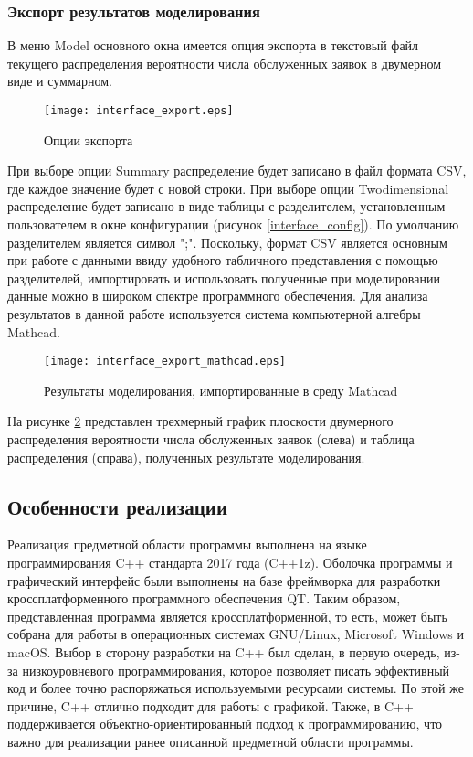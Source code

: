 \subsubsection{Экспорт результатов моделирования}
В меню Model основного окна имеется опция экспорта в текстовый файл текущего распределения вероятности числа обслуженных заявок в двумерном виде и суммарном.
\begin{figure}[H]
	\centering
	\texttt{[image: interface\_export.eps]}
	\caption{Опции экспорта}
	\label{interface_export}
\end{figure}
При выборе опции Summary распределение будет записано в файл формата CSV, где каждое значение будет с новой строки. При выборе опции Twodimensional распределение будет записано в виде таблицы с разделителем, установленным пользователем в окне конфигурации (рисунок \ref{interface_config}). По умолчанию разделителем является символ ";". Поскольку, формат CSV является основным при работе с данными ввиду удобного табличного представления с помощью разделителей, импортировать и использовать полученные при моделировании данные можно в широком спектре программного обеспечения. Для анализа результатов в данной работе используется система компьютерной алгебры Mathcad.
\begin{figure}[H]
	\centering
	\texttt{[image: interface\_export\_mathcad.eps]}
	\caption{Результаты моделирования, импортированные в среду Mathcad}
	\label{interface_export_mathcad}
\end{figure}
На рисунке \ref{interface_export_mathcad} представлен трехмерный график плоскости двумерного распределения вероятности числа обслуженных заявок (слева) и таблица распределения (справа), полученных результате моделирования.
\clearpage

\subsection{Особенности реализации}
Реализация предметной области программы выполнена на языке программирования C++ стандарта 2017 года (C++1z). Оболочка программы и графический интерфейс были выполнены на базе фреймворка для разработки кроссплатформенного программного обеспечения QT. Таким образом, представленная программа является кроссплатформенной, то есть, может быть собрана для работы в операционных системах GNU/Linux, Microsoft Windows и macOS. Выбор в сторону разработки на C++ был сделан, в первую очередь, из-за низкоуровневого программирования, которое позволяет писать эффективный код и более точно распоряжаться используемыми ресурсами системы. По этой же причине, C++ отлично подходит для работы с графикой. Также, в C++ поддерживается объектно-ориентированный подход к программированию, что важно для реализации ранее описанной предметной области программы.

